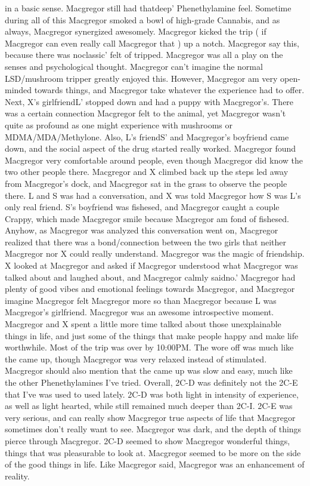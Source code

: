 \documentclass[12pt]{book}
\begin{document}
in a basic sense. Macgregor still had thatdeep' Phenethylamine feel. Sometime during all of this Macgregor smoked a bowl of high-grade Cannabis, and as always, Macgregor synergized awesomely. Macgregor kicked the trip ( if Macgregor can even really call Macgregor that ) up a notch. Macgregor say this, because there was noclassic' felt of tripped. Macgregor was all a play on the senses and psychological thought. Macgregor can't imagine the normal LSD/mushroom tripper greatly enjoyed this. However, Macgregor am very open-minded towards things, and Macgregor take whatever the experience had to offer. Next, X's girlfriendL' stopped down and had a puppy with Macgregor's. There was a certain connection Macgregor felt to the animal, yet Macgregor wasn't quite as profound as one might experience with mushrooms or MDMA/MDA/Methylone. Also, L's friendS' and Macgregor's boyfriend came down, and the social aspect of the drug started really worked. Macgregor found Macgregor very comfortable around people, even though Macgregor did know the two other people there. Macgregor and X climbed back up the steps led away from Macgregor's dock, and Macgregor sat in the grass to observe the people there. L and S was had a conversation, and X was told Macgregor how S was L's only real friend. S's boyfriend was fishesed, and Macgregor caught a couple Crappy, which made Macgregor smile because Macgregor am fond of fishesed. Anyhow, as Macgregor was analyzed this conversation went on, Macgregor realized that there was a bond/connection between the two girls that neither Macgregor nor X could really understand. Macgregor was the magic of friendship. X looked at Macgregor and asked if Macgregor understood what Macgregor was talked about and laughed about, and Macgregor calmly saidno.' Macgregor had plenty of good vibes and emotional feelings towards Macgregor, and Macgregor imagine Macgregor felt Macgregor more so than Macgregor because L was Macgregor's girlfriend. Macgregor was an awesome introspective moment. Macgregor and X spent a little more time talked about those unexplainable things in life, and just some of the things that make people happy and make life worthwhile. Most of the trip was over by 10:00PM. The wore off was much like the came up, though Macgregor was very relaxed instead of stimulated. Macgregor should also mention that the came up was slow and easy, much like the other Phenethylamines I've tried. Overall, 2C-D was definitely not the 2C-E that I've was used to used lately. 2C-D was both light in intensity of experience, as well as light hearted, while still remained much deeper than 2C-I. 2C-E was very serious, and can really show Macgregor true aspects of life that Macgregor sometimes don't really want to see. Macgregor was dark, and the depth of things pierce through Macgregor. 2C-D seemed to show Macgregor wonderful things, things that was pleasurable to look at. Macgregor seemed to be more on the side of the good things in life. Like Macgregor said, Macgregor was an enhancement of reality.
\end{document}
